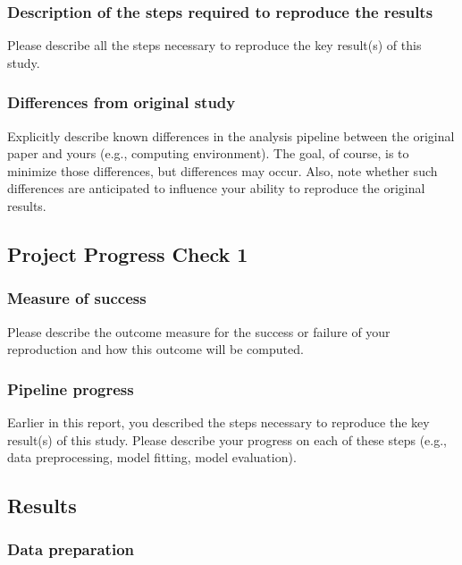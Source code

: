 \documentclass[
  letterpaper,
  DIV=11,
  numbers=noendperiod]{scrartcl}
\begin{document}
\subsubsection{Description of the steps required to reproduce the
results}\label{description-of-the-steps-required-to-reproduce-the-results}

Please describe all the steps necessary to reproduce the key result(s)
of this study.

\subsubsection{Differences from original
study}\label{differences-from-original-study}

Explicitly describe known differences in the analysis pipeline between
the original paper and yours (e.g., computing environment). The goal, of
course, is to minimize those differences, but differences may occur.
Also, note whether such differences are anticipated to influence your
ability to reproduce the original results.

\subsection{Project Progress Check 1}\label{project-progress-check-1}

\subsubsection{Measure of success}\label{measure-of-success}

Please describe the outcome measure for the success or failure of your
reproduction and how this outcome will be computed.

\subsubsection{Pipeline progress}\label{pipeline-progress}

Earlier in this report, you described the steps necessary to reproduce
the key result(s) of this study. Please describe your progress on each
of these steps (e.g., data preprocessing, model fitting, model
evaluation).

\subsection{Results}\label{results}

\subsubsection{Data preparation}\label{data-preparation}
\end{document}
